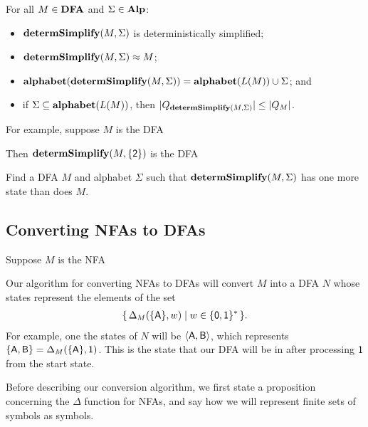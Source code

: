 \begin{theorem}
For all $M\in\mathbf{DFA}$ and $\Sigma\in\mathbf{Alp}$:
\begin{itemize}
\item $\mathbf{determSimplify}(M,\Sigma)$ is deterministically simplified;

\item $\mathbf{determSimplify}(M,\Sigma)\approx M$;

\item $\mathbf{alphabet}(\mathbf{determSimplify}(M,\Sigma)) = \mathbf{alphabet}(L(M))\cup\Sigma$; and

\item if $\Sigma\subseteq\mathbf{alphabet}(L(M))$, then 
  $|Q_{\mathbf{determSimplify}(M, \Sigma)}| \leq |Q_M|$.
\end{itemize}
\end{theorem}

For example, suppose $M$ is the DFA
\begin{center}

\end{center}
Then $\mathbf{determSimplify}(M,\{\mathsf{2}\})$ is the DFA
\begin{center}

\end{center}

\begin{exercise}
Find a DFA $M$ and alphabet $\Sigma$ such that
$\mathbf{determSimplify}(M,\Sigma)$ has one more state than does $M$.
\end{exercise}

\subsection{Converting NFAs to DFAs}

Suppose $M$ is the NFA
\begin{center}

\end{center}
Our algorithm for converting NFAs to DFAs will convert $M$ into a DFA
$N$ whose states represent the elements of the set
\begin{gather*}
\{ \, \Delta_M(\{\mathsf{A}\},w) \mid w\in\{\mathsf{0},\mathsf{1}\}^* \, \} .
\end{gather*}
For example, one the states of $N$ will be $\langle\mathsf{A},\mathsf{B}\rangle$,
which represents $\{\mathsf{A},\mathsf{B}\}=\Delta_M(\{\mathsf{A}\},\mathsf{1})$.
This is the state that our DFA will be in after processing $\mathsf{1}$
from the start state.

Before describing our conversion algorithm, we first state a
proposition concerning the $\Delta$ function for NFAs, and say how we
will represent finite sets of symbols as symbols.

